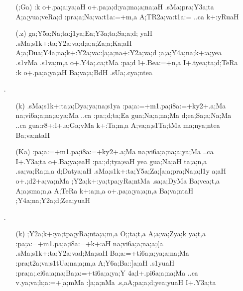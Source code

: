 \begin{itemize}
\begin{itemize}
                \item[({\sktf ;Ga})] {\sktf :k o+.pa;a;ya;aH
o+.pa;a;d;ya;ma;a;na;aH .sMa;pra;Y3a;ta
A;a;yua;veRa;d :pra;a;Na;va:t1a:=+m,a A;TR2a;va:t1a:= ..ca k+:yRuaH}
                
                \item[({\sktf .z})] {\sktf ga;Y5a;Na;ta:j1ya;Ea;Y3a;ta;Sa;a;d;%
yaH .sMa;s1k+:ta;Y2a;va;d;a;a;Za;a;Ka;aH%
 A;a;Dua;Y4a;na;k+:Y2a;va::]a;a;na\ZF{-}+:Y2a;va;d%
;a;a;Y4a;na;k+:a;yea .s1vMa .s1va;m,a o+.Y4a;.ca;tMa :pa;d l+.Bea:=+n,a\ZF{,}
I+.tyea;ta;d;TeRa :k o+.pa;a;ya;aH
Ba;va;a;BdH .sUa;.cya;ntea}
               \end{itemize} 
               
  \item[{\sktf 20}.] \begin{itemize}
             
             \item[({\sktf k})] {\sktf .sMa;s1k+:ta;a;Dya;ya;na;s1ya :pa;a:=+m1.pa;i8a:=+ky2+.a;Ma
na;vi6a;a;na;a;ya;Ma ..ca :pa:;d;ta;Ea gua;Na;a;na;Ma
d;ea;Sa;a;Na;Ma ..ca gua:r8+:l+.a;Ga;vMa k+:Ta;m,a A;va;a;s1Ta;tMa
ma;nya;ntea Ba;va;ntaH}
             
             \item[({\sktf Ka})] {\sktf :pa;a:=+m1.pa;i8a:=+ky2+.a;Ma
na;vi6a;a;na;a;ya;Ma ..ca I+.Y3a;ta o+.Ba;ya;eaH
:pa:;d;tya;eaH yea gua;Na;aH\ZF{,} ta;a;n,a
.sa;va;Ra;n,a d;Da{tya;aH}} {\sktf .sMa;s1k+:ta;Y5a;Za;[a;a;pra;Na;a;l1y%
a;aH o+.;d2+a;va;nMa ;Y2a;k+:ya;tpa;yRa;ntMa .sa;a;DyMa
Ba;vea;t,a A;a;sma;n,a A;TeRa k+:a;n,a
o+.pa;a;ya;a;n,a Ba;va;ntaH ;Y4a;na;Y2a;d;Zea;yuaH}
             \end{itemize} 
             
             
 \item[{\sktf 21}.]  \begin{itemize}
                
                \item[({\sktf k})] {\sktf ;Y2a;k+:ya;tpa;yRa;nta;a;m,a
O;;ta;t,a A;a;va;Zya;k ya;t,a :pa;a:=+m1.pa;a;i8a:=+k+:aH%
 na;vi6a;a;na;a;(a} {\sktf .sMa;s1k+:ta{;Y2a;va}{d;Ma};saH Ba;a:=+ti6a;a;ya;a;na;Ma :pra;t2a;va;s1tUa;na;a;m,a
A;Y6a;Ba::]a;aH .s1yuaH\ZF{,} :pra;a;.ci6a;a;na;Ba;a:=+ti6a;a;ya;Y%
4a;l+.pi6a;a;na;Ma ..ca v.ya;va;h;a:=+[a;mMa :]a;a;nMa .s,aA;pa;a;d;yea;yuaH I+.Y3a;ta}
                

\end{itemize}
\end{itemize}
